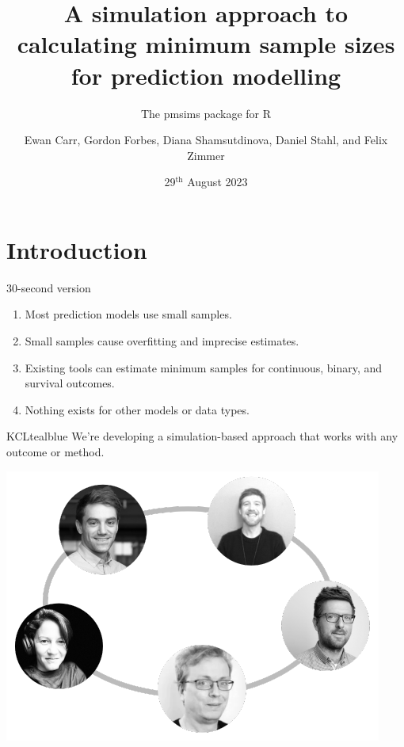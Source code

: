 \documentclass[11pt]{beamer}
\title[The pmsims package for R]{
    A simulation approach to calculating minimum sample sizes for prediction
    modelling
}
\subtitle{The pmsims package for R}
\date{29$^{\text{th}}$ August 2023}
\author[Biostatistics \& Health Informatics, KCL]{%
	Ewan Carr, Gordon Forbes, Diana Shamsutdinova, Daniel Stahl,
	and Felix Zimmer}
\institute[]{Department of Biostatistics \& Health Informatics\\ King's College London}
\newcommand{\sgap}{\vspace{0.5em}}
\begin{document}
\maketitle

\section{Introduction}

\begin{frame}[c]{30-second version}
	\Large
	\begin{enumerate}
		\setlength{\itemsep}{12pt}

		\item Most prediction models use small samples.

		\item Small samples cause overfitting and imprecise estimates.

		\item Existing tools can estimate minimum samples for continuous,
		      binary, and survival outcomes.

		\item Nothing exists for other models or data types.

	\end{enumerate}

	\sgap

	\begin{cbox}{KCLtealblue}{}
		We're developing a simulation-based approach that works with any
		outcome or method.
	\end{cbox}
	\vspace{-1em}
\end{frame}

\begin{frame}[c]
	\includegraphics[width=\textwidth]{figures/group_photos.pdf}
\end{frame}
\end{document}
